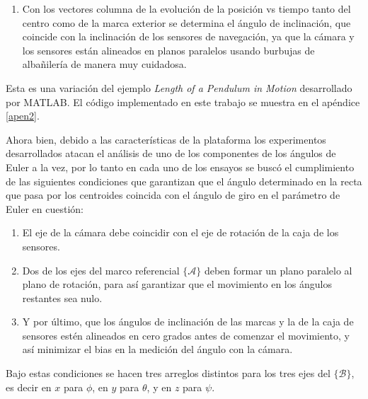 \documentclass[conference]{IEEEtran}
\newcommand{\marco}[1]{\{\mathcal{#1}\}}
\begin{document}
\begin{enumerate}
\begin{enumerate}
\item Con los vectores columna de la evolución de la posición vs tiempo tanto del centro como de la marca exterior se determina el ángulo de inclinación, que coincide con la inclinación de los sensores de navegación, ya que la cámara y los sensores están alineados en planos paralelos usando burbujas de albañilería de manera muy cuidadosa.
\end{enumerate}
Esta es una variación del ejemplo \textsl{Length of a Pendulum in Motion} desarrollado por MATLAB. El código implementado en este trabajo se muestra en el apéndice \ref{apen2}.\par
Ahora bien, debido a las características de la plataforma los experimentos desarrollados atacan el análisis de uno de los componentes de los ángulos de Euler a la vez, por lo tanto en cada uno de los ensayos se buscó el cumplimiento de las siguientes condiciones que garantizan que el ángulo determinado en la recta que pasa por los centroides coincida con el ángulo de giro en el parámetro de Euler en cuestión:
\begin{enumerate}
\item El eje de la cámara debe coincidir con el eje de rotación de la caja de los sensores.
\item Dos de los ejes del marco referencial $\marco{A}$ deben formar un plano paralelo al plano de rotación, para así garantizar que el movimiento en los ángulos restantes sea nulo.
\item Y por último, que los ángulos de inclinación de las marcas y la de la caja de sensores estén alineados en cero grados antes de comenzar el movimiento, y así minimizar el bias en la medición del ángulo con la cámara.
\end{enumerate}
Bajo estas condiciones se hacen tres arreglos distintos para los tres ejes del $\marco{B}$, es decir en $x$ para $\phi$, en $y$ para $\theta$, y en $z$ para $\psi$.

\end{enumerate}
\end{document}
